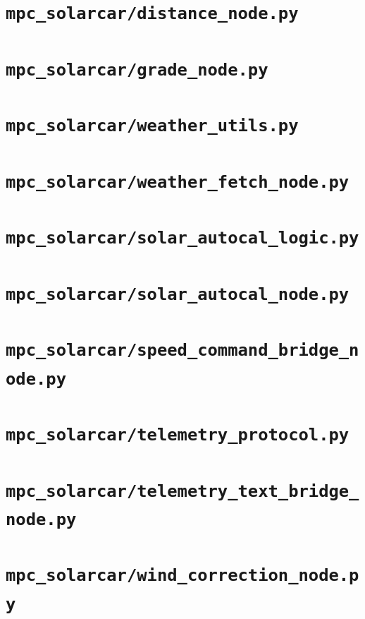 \documentclass[a4paper,10pt,oneside]{book}
\begin{document}
\section{\texttt{mpc\_solarcar/distance\_node.py}}

\section{\texttt{mpc\_solarcar/grade\_node.py}}

\section{\texttt{mpc\_solarcar/weather\_utils.py}}

\section{\texttt{mpc\_solarcar/weather\_fetch\_node.py}}

\section{\texttt{mpc\_solarcar/solar\_autocal\_logic.py}}

\section{\texttt{mpc\_solarcar/solar\_autocal\_node.py}}

\section{\texttt{mpc\_solarcar/speed\_command\_bridge\_node.py}}

\section{\texttt{mpc\_solarcar/telemetry\_protocol.py}}

\section{\texttt{mpc\_solarcar/telemetry\_text\_bridge\_node.py}}

\section{\texttt{mpc\_solarcar/wind\_correction\_node.py}}

\end{document}
